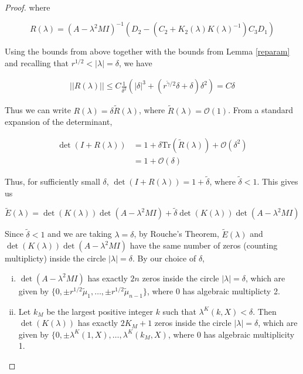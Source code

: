 \documentclass[thesis.tex]{subfiles}
\begin{document}
\begin{lemma}
\begin{proof}
where

\[
R(\lambda) = 
(A - \lambda^2 MI)^{-1}(D_2 - (C_2 + K_2(\lambda)K(\lambda)^{-1})C_3 D_1)
\]

Using the bounds from above together with the bounds from Lemma \ref{reparam} and recalling that $r^{1/2} < |\lambda| = \delta$, we have

\begin{align*}
||R(\lambda)|| \leq C \frac{1}{\delta^2}
( |\delta|^3 + (r^{\tilde{\gamma}/2}\delta + \delta)\delta^2) = C \delta
\end{align*}

Thus we can write $R(\lambda) = \delta \tilde{R}(\lambda)$, where $\tilde{R}(\lambda) = \mathcal{O}(1)$. From a standard expansion of the determinant, 

\begin{align*}
\det(I + R(\lambda)) &= 1 + \delta \text{Tr}(\tilde{R}(\lambda)) + \mathcal{O}(\delta^2) \\
&= 1 + \mathcal{O}(\delta)
\end{align*}

Thus, for sufficiently small $\delta$, $\det(I + R(\lambda)) = 1 + \tilde{\delta}$, where $\tilde{\delta} < 1$. This gives us 

\begin{equation}
\tilde{E}(\lambda) = \det(K(\lambda))\det(A - \lambda^2 MI) + \tilde{\delta} \det(K(\lambda))\det(A - \lambda^2 MI)
\end{equation}

Since $\tilde{\delta} < 1$ and we are taking $\lambda = \delta$, by Rouche's Theorem, $\tilde{E}(\lambda)$ and $\det(K(\lambda))\det(A - \lambda^2 MI)$ have the same number of zeros (counting multiplicty) inside the circle $|\lambda| = \delta$. By our choice of $\delta$, 

\begin{enumerate}[(i)]
\item $\det(A - \lambda^2 MI)$ has exactly $2n$ zeros inside the circle $|\lambda| = \delta$, which are given by $\{ 0, \pm r^{1/2} \tilde{\mu}_1, \dots, \pm r^{1/2} \tilde{\mu}_{n-1} \}$, where 0 has algebraic multiplicty 2.

\item Let $k_M$ be the largest positive integer $k$ such that $\lambda^K(k,X) < \delta$. Then $\det(K(\lambda))$ has exactly $2 K_M + 1$ zeros inside the circle $|\lambda| = \delta$, which are given by $\{0, \pm \lambda^K(1,X), \dots, \lambda^K(k_M,X)$, where 0 has algebraic multiplicity 1.
\end{enumerate}


\end{proof}
\end{lemma}
\end{document}
